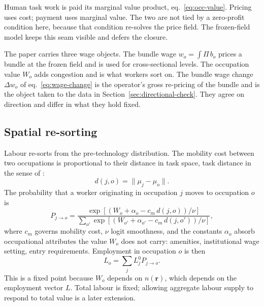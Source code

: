 \documentclass[12pt, a4paper]{article}
\begin{document}
Human task work is paid its marginal value product,
eq.~\eqref{eq:occ-value}. Pricing uses cost; payment uses marginal
value. The two are not tied by a zero-profit condition here, because
that condition re-solves the price field. The frozen-field model keeps
this seam visible and defers the closure.

The paper carries three wage objects. The bundle wage
$w_o=\int\Pi\,b_o$ prices a bundle at the frozen field and is used for
cross-sectional levels. The occupation value $W_o$ adds congestion and
is what workers sort on. The bundle wage change
$\Delta w_o$ of eq.~\eqref{eq:wage-change} is the operator's gross
re-pricing of the bundle and is the object taken to the data in
Section~\ref{sec:directional-check}. They agree on direction and differ
in what they hold fixed.

\subsection{Spatial re-sorting}
\label{sec:sorting}

Labour re-sorts from the pre-technology distribution. The mobility cost
between two occupations is proportional to their distance in task space,
task distance in the sense of \textcite{gathmann2010}:
\[
  d(j,o)=\|\mu_j-\mu_o\|.
\]
The probability that a worker originating in occupation $j$ moves to
occupation $o$ is
\begin{equation}
  P_{j\to o}
  =
  \frac{
    \exp[(W_o+\alpha_o-c_m\,d(j,o))/\nu]
  }{
    \sum_{o'}
    \exp[(W_{o'}+\alpha_{o'}-c_m\,d(j,o'))/\nu]
  },
  \label{eq:transition-probability}
\end{equation}
where $c_m$ governs mobility cost, $\nu$ logit smoothness, and the
constants $\alpha_o$ absorb occupational attributes the value $W_o$
does not carry: amenities, institutional wage setting, entry
requirements. Employment
in occupation $o$ is then
\begin{equation}
  L_o
  =
  \sum_j L_j^0 P_{j\to o}.
  \label{eq:equilibrium}
\end{equation}
This is a fixed point because $W_o$ depends on $n(\mathbf{r})$, which
depends on the employment vector $L$. Total labour is fixed; allowing
aggregate labour supply to respond to total value is a later extension.
\end{document}
